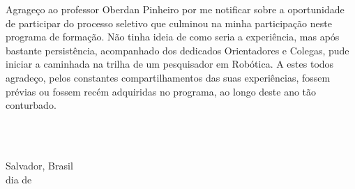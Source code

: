 \begin{agradecimentos}

Agrageço ao professor Oberdan Pinheiro por me notificar sobre a oportunidade de participar do processo seletivo que culminou na minha participação neste programa de formação. Não tinha ideia de como seria a experiência, mas após bastante persistência, acompanhado dos dedicados Orientadores e Colegas, pude iniciar a caminhada na trilha de um pesquisador em Robótica. A estes todos agradeço, pelos constantes compartilhamentos das suas experiências, fossem prévias ou fossem recém adquiridas no programa, ao longo deste ano tão conturbado.





\ \\
\ \\

\noindent

\raggedright
Salvador, Brasil \\ 
dia de \mesdeano \\

\raggedleft
\theauthor\\ \theauthorr\\ \theauthorrr\\ \theauthorrrr\\

\end{agradecimentos}
